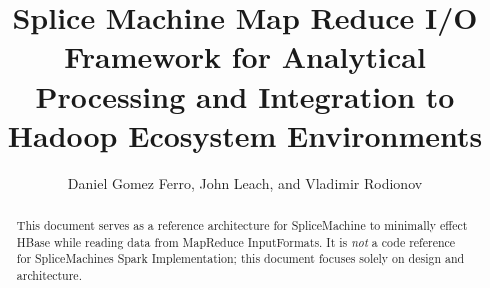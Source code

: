\documentclass[10pt]{amsart}
\begin{document}
\title{Splice Machine Map Reduce I/O Framework for Analytical Processing and
Integration to Hadoop Ecosystem Environments}
\author{Daniel Gomez Ferro, John Leach, and Vladimir Rodionov} 

\begin{abstract}
This document serves as a reference architecture for SpliceMachine to minimally
effect HBase while reading data from MapReduce InputFormats.  It is \emph{not} a
code reference for SpliceMachines Spark Implementation; this document focuses solely on design and architecture.
\end{abstract}

\maketitle


\end{document}
